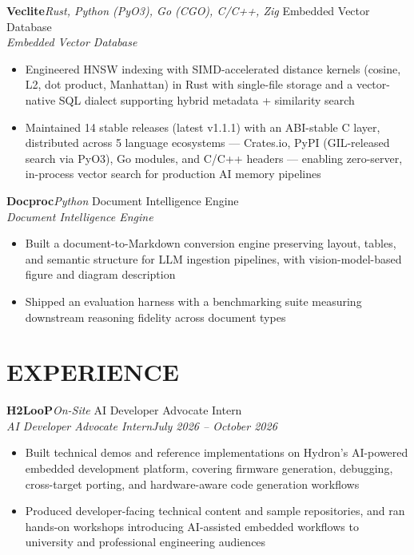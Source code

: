 \documentclass[letterpaper,11pt]{article}
\newcommand{\entry}[4]{%
  \par\vspace{5pt}
  \noindent\textbf{#1}\hfill\textit{#2}%
  \ifx\relax#3\relax\else%
    \\[-1pt]\textit{#3}\hfill\textit{#4}%
  \fi%
  \par\vspace{1pt}%
}
\begin{document}
\entry{Veclite}{Rust, Python (PyO3), Go (CGO), C/C++, Zig}
{Embedded Vector Database}{}
\begin{itemize}
  \item Engineered HNSW indexing with SIMD-accelerated distance kernels (cosine, L2,
        dot product, Manhattan) in Rust with single-file storage and a vector-native SQL
        dialect supporting hybrid metadata + similarity search
  \item Maintained 14 stable releases (latest v1.1.1) with an ABI-stable C layer,
        distributed across 5 language ecosystems --- Crates.io, PyPI (GIL-released
        search via PyO3), Go modules, and C/C++ headers --- enabling zero-server,
        in-process vector search for production AI memory pipelines
\end{itemize}

\entry{Docproc}{Python}
{Document Intelligence Engine}{}
\begin{itemize}
  \item Built a document-to-Markdown conversion engine preserving layout, tables, and
        semantic structure for LLM ingestion pipelines, with vision-model-based figure
        and diagram description
  \item Shipped an evaluation harness with a benchmarking suite measuring downstream
        reasoning fidelity across document types
\end{itemize}

\section{EXPERIENCE}

\entry{H2LooP}{On-Site}
{AI Developer Advocate Intern}{July 2026 -- October 2026}
\begin{itemize}
  \item Built technical demos and reference implementations on Hydron's AI-powered
        embedded development platform, covering firmware generation, debugging,
        cross-target porting, and hardware-aware code generation workflows
  \item Produced developer-facing technical content and sample repositories, and ran
        hands-on workshops introducing AI-assisted embedded workflows to university and
        professional engineering audiences
\end{itemize}

\end{document}
